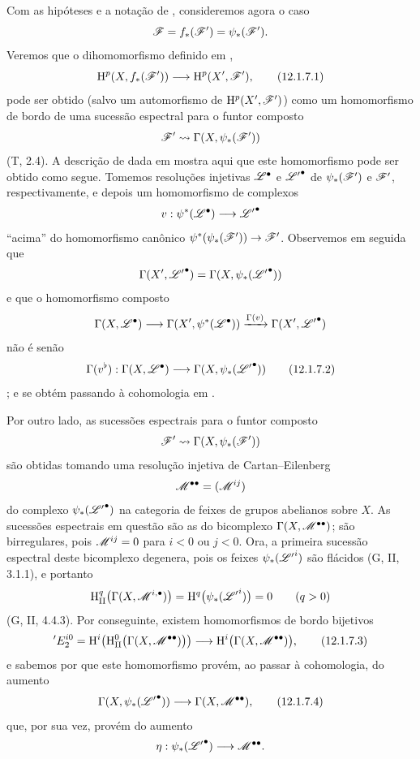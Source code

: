 \begin{env}[12.1.7]
\label{0.12.1.7}
Com as hipóteses e a notação de , consideremos agora o
caso
\[
  \mathscr{F}=f_*(\mathscr{F}')=\psi_*(\mathscr{F}').
\]
Veremos que o dihomomorfismo definido em ,
\[
  \HH^p(X,f_*(\sh{F}'))\longrightarrow\HH^p(X',\sh{F}'),
  \tag{12.1.7.1}
  \label{0.12.1.7.1}
\]
pode ser obtido (salvo um automorfismo de $\mathrm{H}^p(X',\mathscr{F}')$) como um
homomorfismo de bordo de uma sucessão espectral para o funtor composto
\[
  \mathscr{F}'\leadsto\Gamma(X,\psi_*(\mathscr{F}'))
\]
(T, 2.4).
A descrição de  dada em  mostra
aqui que este homomorfismo pode ser obtido como segue.
Tomemos resoluções injetivas $\mathscr{L}^\bullet$ e
${\mathscr{L}'}^\bullet$ de $\psi_*(\mathscr{F}')$ e $\mathscr{F}'$,
respectivamente, e depois um homomorfismo de complexos
\[
  v:\psi^*(\mathscr{L}^\bullet)\longrightarrow{\mathscr{L}'}^\bullet
\]
``acima'' do homomorfismo canônico
$\psi^*(\psi_*(\sh{F}'))\to\sh{F}'$.
Observemos em seguida que
\[
  \Gamma(X',{\mathscr{L}'}^\bullet)
  =\Gamma(X,\psi_*({\mathscr{L}'}^\bullet))
\]
e que o homomorfismo composto
\[
  \Gamma(X,\mathscr{L}^\bullet)
  \longrightarrow\Gamma(X',\psi^*(\mathscr{L}^\bullet))
  \xrightarrow{\Gamma(v)}\Gamma(X',{\mathscr{L}'}^\bullet)
\]
não é senão
\[
  \Gamma(v^\flat):
  \Gamma(X,\sh{L}^\bullet)
  \longrightarrow\Gamma(X,\psi_*({\sh{L}'}^\bullet))
  \tag{12.1.7.2}
  \label{0.12.1.7.2}
\]
; e  se
obtém passando à cohomologia em .

Por outro lado, as sucessões espectrais para o funtor composto
\[
  \mathscr{F}'\leadsto\Gamma(X,\psi_*(\mathscr{F}'))
\]
são obtidas tomando uma resolução injetiva de Cartan--Eilenberg
\[
  \mathscr{M}^{\bullet\bullet}=(\mathscr{M}^{ij})
\]
do complexo $\psi_*({\mathscr{L}'}^\bullet)$ na categoria de
feixes de grupos abelianos sobre $X$.
As sucessões espectrais em questão são as do bicomplexo
$\Gamma(X,\mathscr{M}^{\bullet\bullet})$; são birregulares, pois
$\mathscr{M}^{ij}=0$ para $i<0$ ou $j<0$.
Ora, a primeira sucessão espectral deste bicomplexo degenera, pois
os feixes $\psi_*({\mathscr{L}'}^i)$ são flácidos (G, II, 3.1.1), e
portanto
\[
  \mathrm{H}_\mathrm{II}^q
    \bigl(\Gamma(X,\mathscr{M}^{i,\bullet})\bigr)
  =\mathrm{H}^q\bigl(\psi_*({\mathscr{L}'}^i)\bigr)=0
  \qquad(q>0)
\]
(G, II, 4.4.3).
Por conseguinte, existem homomorfismos de bordo bijetivos
\[
  {}'E_2^{i0}
  =\HH^i\!\left(
      \HH_\mathrm{II}^0
        \bigl(\Gamma(X,\sh{M}^{\bullet\bullet})\bigr)
    \right)
  \longrightarrow
  \HH^i\bigl(\Gamma(X,\sh{M}^{\bullet\bullet})\bigr),
  \tag{12.1.7.3}
  \label{0.12.1.7.3}
\]
e sabemos por  que este homomorfismo provém, ao passar
à cohomologia, do aumento
\[
  \Gamma(X,\psi_*({\sh{L}'}^\bullet))
  \longrightarrow\Gamma(X,\sh{M}^{\bullet\bullet}),
  \tag{12.1.7.4}
  \label{0.12.1.7.4}
\]
que, por sua vez, provém do aumento
\[
  \eta:\psi_*({\mathscr{L}'}^\bullet)
  \longrightarrow\mathscr{M}^{\bullet\bullet}.
\]


\end{env}
